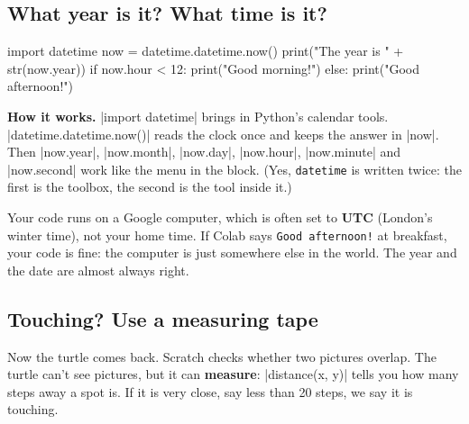 \subsection*{What year is it? What time is it?}

\begin{center}
\begin{scratch}
\end{scratch}
\end{center}
\vspace{-4pt}
\begin{code}
import datetime
now = datetime.datetime.now()
print("The year is " + str(now.year))
if now.hour < 12:
    print("Good morning!")
else:
    print("Good afternoon!")
\end{code}

\textbf{How it works.} \py|import datetime| brings in Python's calendar tools. \py|datetime.datetime.now()| reads the clock once and keeps the answer in \py|now|. Then \py|now.year|, \py|now.month|, \py|now.day|, \py|now.hour|, \py|now.minute| and \py|now.second| work like the menu in the  block. (Yes, \texttt{datetime} is written twice: the first is the toolbox, the second is the tool inside it.)

\begin{watchout}
Your code runs on a Google computer, which is often set to \textbf{UTC} (London's winter time), not your home time. If Colab says \texttt{Good afternoon!} at breakfast, your code is fine: the computer is just somewhere else in the world. The year and the date are almost always right.
\end{watchout}

\subsection*{Touching? Use a measuring tape}

Now the turtle comes back. Scratch checks whether two pictures overlap. The turtle can't see pictures, but it can \textbf{measure}: \py|distance(x, y)| tells you how many steps away a spot is. If it is very close, say less than 20 steps, we say it is touching.

